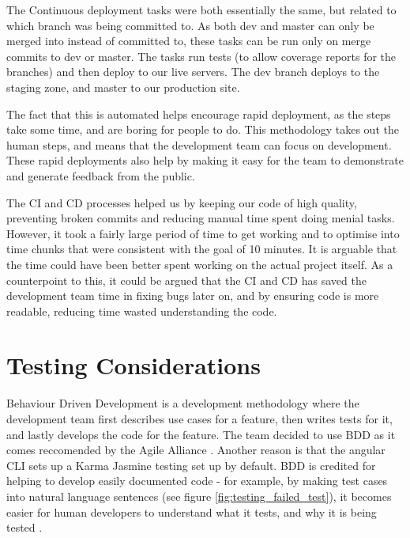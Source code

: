 \documentclass{l3proj}
\begin{document}
 

The Continuous deployment tasks were both essentially the same, but related to which branch was being
 committed to. As both dev and master can only be merged into instead of committed to, these tasks can
 be run only on merge commits to dev or master. The tasks run tests (to allow coverage reports for the branches)
 and then deploy to our live servers. The dev branch deploys to the staging zone, and
 master to our production site.

The fact that this is automated helps encourage rapid deployment, as the steps take some time, and are
 boring for people to do. This methodology takes out the human steps, and means that the development team
 can focus on development. These rapid deployments also help by making it easy for the team to demonstrate
 and generate feedback from the public.


The CI and CD processes helped us by keeping our code of high quality, preventing broken commits and reducing
 manual time spent doing menial tasks. However, it took a fairly large period of time to get working and to
 optimise into time chunks that were consistent with the goal of 10 minutes. It is arguable that the time
 could have been better spent working on the actual project itself. As a counterpoint to this, it could be
 argued that the CI and CD has saved the development team time in fixing bugs later on, and by ensuring code is more
 readable, reducing time wasted understanding the code.

\newpage
\section{Testing Considerations}
\label{sec:testing}

Behaviour Driven Development is a development methodology where the development team
 first describes use cases for a feature, then writes tests for it, and lastly
 develops the code for the feature. The team decided to use BDD as it comes
 reccomended by the Agile Alliance \cite{agilealliance_bdd}. Another reason
 is that the angular CLI sets up a Karma Jasmine testing set up by default.
 BDD is credited for helping to develop easily documented code - for example,
 by making test cases into natural language sentences (see figure
 \ref{fig:testing_failed_test}), it becomes easier for human developers to
 understand what it tests, and why it is being tested \cite{north2006bdd}.
\end{document}
